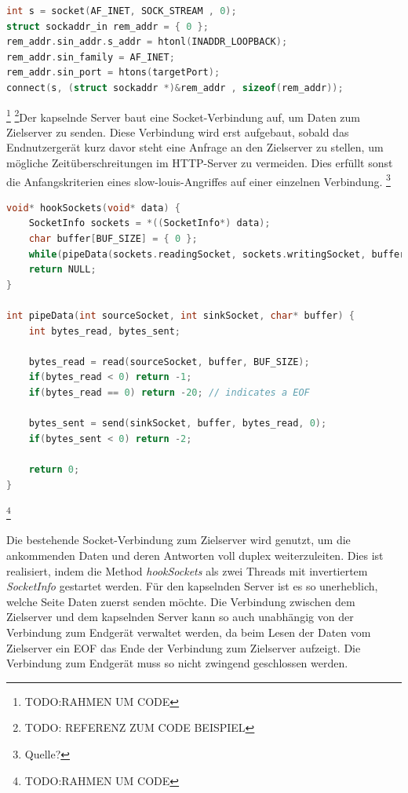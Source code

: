 \documentclass[12pt,a4paper]{article}
\begin{document}
        \begin{lstlisting}[language=C, caption=Instanziierung eines Sockets (Server: C)]
int s = socket(AF_INET, SOCK_STREAM , 0);
struct sockaddr_in rem_addr = { 0 };
rem_addr.sin_addr.s_addr = htonl(INADDR_LOOPBACK);
rem_addr.sin_family = AF_INET;
rem_addr.sin_port = htons(targetPort);
connect(s, (struct sockaddr *)&rem_addr , sizeof(rem_addr));
        \end{lstlisting}\footnote{TODO:RAHMEN UM CODE}
        \footnote{TODO: REFERENZ ZUM CODE BEISPIEL}Der kapselnde Server baut eine Socket-Verbindung auf, um Daten zum Zielserver zu senden. Diese Verbindung wird erst aufgebaut, sobald das Endnutzergerät kurz davor steht eine Anfrage an den Zielserver zu stellen, um mögliche Zeitüberschreitungen im HTTP-Server zu vermeiden. Dies erfüllt sonst die Anfangskriterien eines slow-louis-Angriffes auf einer einzelnen Verbindung. \footnote{Quelle?}
        \begin{lstlisting}[language=C, caption=Datenweiterleitung durch Sockets (Server: C)]
void* hookSockets(void* data) {
    SocketInfo sockets = *((SocketInfo*) data);
    char buffer[BUF_SIZE] = { 0 };
    while(pipeData(sockets.readingSocket, sockets.writingSocket, buffer) >= 0) { ;; }
    return NULL;
}        
        
int pipeData(int sourceSocket, int sinkSocket, char* buffer) {
    int bytes_read, bytes_sent;

    bytes_read = read(sourceSocket, buffer, BUF_SIZE);
    if(bytes_read < 0) return -1;
    if(bytes_read == 0) return -20; // indicates a EOF

    bytes_sent = send(sinkSocket, buffer, bytes_read, 0);
    if(bytes_sent < 0) return -2;

    return 0;
}
        \end{lstlisting}\footnote{TODO:RAHMEN UM CODE}
        
        Die bestehende Socket-Verbindung zum Zielserver wird genutzt, um die ankommenden Daten und deren Antworten voll duplex weiterzuleiten. Dies ist realisiert, indem die Method {\it hookSockets} als zwei Threads mit invertiertem {\it SocketInfo} gestartet werden. Für den kapselnden Server ist es so unerheblich, welche Seite Daten zuerst senden möchte. Die Verbindung zwischen dem Zielserver und dem kapselnden Server kann so auch unabhängig von der Verbindung zum Endgerät verwaltet werden, da beim Lesen der Daten vom Zielserver ein EOF das Ende der Verbindung zum Zielserver aufzeigt. Die Verbindung zum Endgerät muss so nicht zwingend geschlossen werden.
\end{document}

